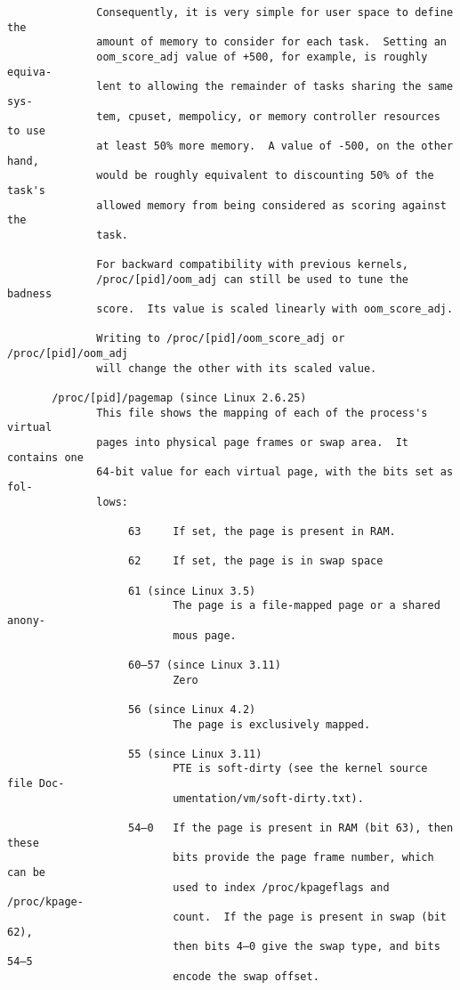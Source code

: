\documentclass[]{article}
\begin{document}
\begin{verbatim}
              Consequently, it is very simple for user space to define the
              amount of memory to consider for each task.  Setting an
              oom_score_adj value of +500, for example, is roughly equiva‐
              lent to allowing the remainder of tasks sharing the same sys‐
              tem, cpuset, mempolicy, or memory controller resources to use
              at least 50% more memory.  A value of -500, on the other hand,
              would be roughly equivalent to discounting 50% of the task's
              allowed memory from being considered as scoring against the
              task.

              For backward compatibility with previous kernels,
              /proc/[pid]/oom_adj can still be used to tune the badness
              score.  Its value is scaled linearly with oom_score_adj.

              Writing to /proc/[pid]/oom_score_adj or /proc/[pid]/oom_adj
              will change the other with its scaled value.

       /proc/[pid]/pagemap (since Linux 2.6.25)
              This file shows the mapping of each of the process's virtual
              pages into physical page frames or swap area.  It contains one
              64-bit value for each virtual page, with the bits set as fol‐
              lows:

                   63     If set, the page is present in RAM.

                   62     If set, the page is in swap space

                   61 (since Linux 3.5)
                          The page is a file-mapped page or a shared anony‐
                          mous page.

                   60–57 (since Linux 3.11)
                          Zero

                   56 (since Linux 4.2)
                          The page is exclusively mapped.

                   55 (since Linux 3.11)
                          PTE is soft-dirty (see the kernel source file Doc‐
                          umentation/vm/soft-dirty.txt).

                   54–0   If the page is present in RAM (bit 63), then these
                          bits provide the page frame number, which can be
                          used to index /proc/kpageflags and /proc/kpage‐
                          count.  If the page is present in swap (bit 62),
                          then bits 4–0 give the swap type, and bits 54–5
                          encode the swap offset.


\end{verbatim}
\end{document}
